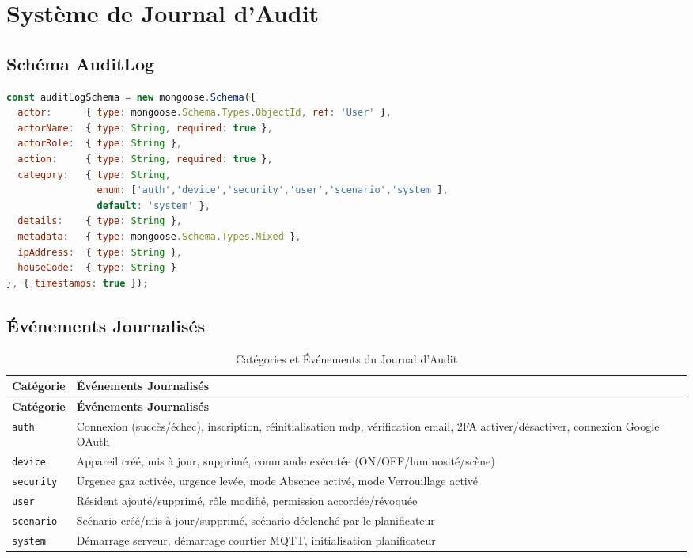 \section{Système de Journal d'Audit}

\subsection{Schéma AuditLog}

\begin{lstlisting}[style=codeblock,language=JavaScript,caption={Sch\'ema AuditLog (backend/models/AuditLog.js)}]
const auditLogSchema = new mongoose.Schema({
  actor:      { type: mongoose.Schema.Types.ObjectId, ref: 'User' },
  actorName:  { type: String, required: true },
  actorRole:  { type: String },
  action:     { type: String, required: true },
  category:   { type: String,
                enum: ['auth','device','security','user','scenario','system'],
                default: 'system' },
  details:    { type: String },
  metadata:   { type: mongoose.Schema.Types.Mixed },
  ipAddress:  { type: String },
  houseCode:  { type: String }
}, { timestamps: true });
\end{lstlisting}

\subsection{Événements Journalisés}

\begin{center}
\begin{longtable}{p{} p{}}
\caption{Catégories et Événements du Journal d'Audit}\label{tab:audit_events}\\
\toprule
\textbf{Catégorie} & \textbf{Événements Journalisés} \\
\midrule
\endfirsthead
\toprule
\textbf{Catégorie} & \textbf{Événements Journalisés} \\
\midrule
\endhead
\bottomrule
\endfoot
\texttt{auth}     & Connexion (succès/échec), inscription, réinitialisation mdp, vérification email, 2FA activer/désactiver, connexion Google OAuth \\
\texttt{device}   & Appareil créé, mis à jour, supprimé, commande exécutée (ON/OFF/luminosité/scène) \\
\texttt{security} & Urgence gaz activée, urgence levée, mode Absence activé, mode Verrouillage activé \\
\texttt{user}     & Résident ajouté/supprimé, rôle modifié, permission accordée/révoquée \\
\texttt{scenario} & Scénario créé/mis à jour/supprimé, scénario déclenché par le planificateur \\
\texttt{system}   & Démarrage serveur, démarrage courtier MQTT, initialisation planificateur \\
\end{longtable}
\end{center}

